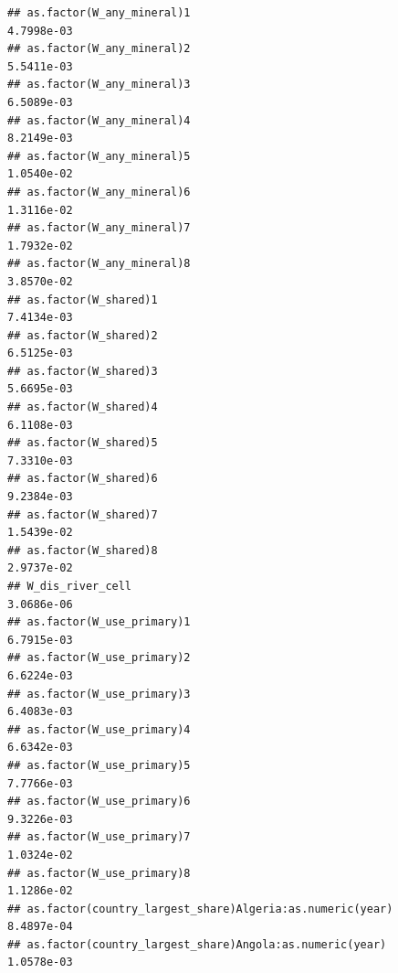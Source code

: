\documentclass[
  a4paper,
]{article}
\begin{document}
\begin{verbatim}
## as.factor(W_any_mineral)1                                                          4.7998e-03
## as.factor(W_any_mineral)2                                                          5.5411e-03
## as.factor(W_any_mineral)3                                                          6.5089e-03
## as.factor(W_any_mineral)4                                                          8.2149e-03
## as.factor(W_any_mineral)5                                                          1.0540e-02
## as.factor(W_any_mineral)6                                                          1.3116e-02
## as.factor(W_any_mineral)7                                                          1.7932e-02
## as.factor(W_any_mineral)8                                                          3.8570e-02
## as.factor(W_shared)1                                                               7.4134e-03
## as.factor(W_shared)2                                                               6.5125e-03
## as.factor(W_shared)3                                                               5.6695e-03
## as.factor(W_shared)4                                                               6.1108e-03
## as.factor(W_shared)5                                                               7.3310e-03
## as.factor(W_shared)6                                                               9.2384e-03
## as.factor(W_shared)7                                                               1.5439e-02
## as.factor(W_shared)8                                                               2.9737e-02
## W_dis_river_cell                                                                   3.0686e-06
## as.factor(W_use_primary)1                                                          6.7915e-03
## as.factor(W_use_primary)2                                                          6.6224e-03
## as.factor(W_use_primary)3                                                          6.4083e-03
## as.factor(W_use_primary)4                                                          6.6342e-03
## as.factor(W_use_primary)5                                                          7.7766e-03
## as.factor(W_use_primary)6                                                          9.3226e-03
## as.factor(W_use_primary)7                                                          1.0324e-02
## as.factor(W_use_primary)8                                                          1.1286e-02
## as.factor(country_largest_share)Algeria:as.numeric(year)                           8.4897e-04
## as.factor(country_largest_share)Angola:as.numeric(year)                            1.0578e-03

\end{verbatim}
\end{document}
